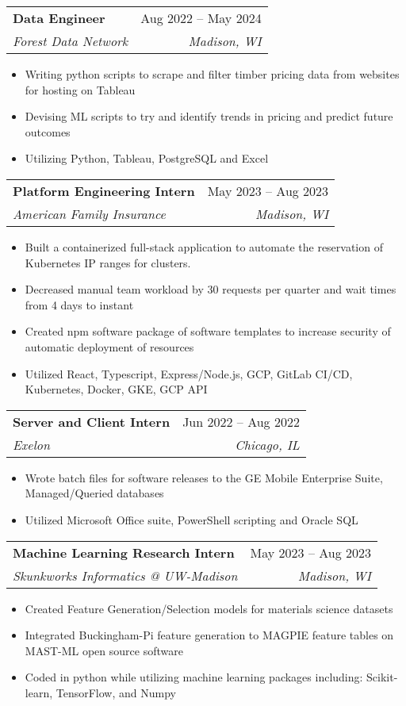 \documentclass[letterpaper,11pt]{article}
\makeatletter
\newcommand{\resumeItem}[1]{
  \item\small{
    {#1 \vspace{-2pt}}
  }
}
\newcommand{\resumeSubheading}[4]{
  \vspace{-2pt}\item
    \begin{tabular*}{0.97\textwidth}[t]{l@{\extracolsep{\fill}}r}
      \textbf{#1} & #2 \\
      \textit{\small#3} & \textit{\small #4} \\
    \end{tabular*}\vspace{-7pt}
}
\newcommand{\resumeSubSubheading}[2]{
    \item
    \begin{tabular*}{0.97\textwidth}{l@{\extracolsep{\fill}}r}
      \textit{\small#1} & \textit{\small #2} \\
    \end{tabular*}\vspace{-7pt}
}
\newcommand{\resumeSubHeadingListEnd}{\end{itemize}}
\newcommand{\resumeItemListStart}{\begin{itemize}}
\newcommand{\resumeItemListEnd}{\end{itemize}\vspace{-5pt}}
\makeatother
\begin{document}
      

    \resumeSubheading
      {Data Engineer}{Aug 2022 -- May 2024}
      {Forest Data Network}{Madison, WI}
      \resumeItemListStart
        \resumeItem{Writing python scripts to scrape and filter timber pricing data from websites for hosting on Tableau}
        \resumeItem{Devising ML scripts to try and identify trends in pricing and predict future outcomes}
        \resumeItem{Utilizing Python, Tableau, PostgreSQL and Excel}
    \resumeItemListEnd

    \resumeSubheading
      {Platform Engineering Intern}{May 2023 -- Aug 2023}
      {American Family Insurance}{Madison, WI}
      \resumeItemListStart
        \resumeItem{Built a containerized full-stack application to automate the reservation of Kubernetes IP ranges for clusters.}
        \resumeItem{Decreased manual team workload by 30 requests per quarter and wait times from 4 days to instant}
        \resumeItem{Created npm software package of software templates to increase security of automatic deployment of resources}
        \resumeItem{Utilized React, Typescript, Express/Node.js, GCP, GitLab CI/CD, Kubernetes, Docker, GKE, GCP API}
      \resumeItemListEnd

    \resumeSubheading
      {Server and Client Intern}{Jun 2022 -- Aug 2022}
      {Exelon}{Chicago, IL}
      \resumeItemListStart
        \resumeItem{Wrote batch files for software releases to the GE Mobile Enterprise Suite, Managed/Queried databases}
        \resumeItem{Utilized Microsoft Office suite, PowerShell scripting and Oracle SQL}
      \resumeItemListEnd
      
    \resumeSubheading
      {Machine Learning Research Intern}{May 2023 -- Aug 2023}
      {Skunkworks Informatics @ UW-Madison}{Madison, WI}
      \resumeItemListStart
        \resumeItem{Created Feature Generation/Selection models for materials science datasets}
        \resumeItem{Integrated Buckingham-Pi feature generation to MAGPIE feature tables on MAST-ML open source software}
        \resumeItem{Coded in python while utilizing machine learning packages including: Scikit-learn, TensorFlow, and Numpy}
      \resumeItemListEnd
      
\end{document}

